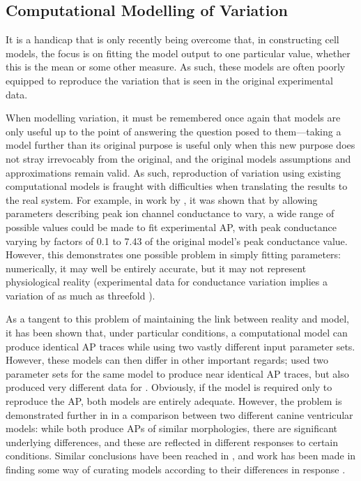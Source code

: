 \documentclass[../thesis-main.tex]{subfiles}
\begin{document}
 \subsection{Computational Modelling of Variation}
 \label{subsec:comp-var}
 It is a handicap that is only recently being overcome that, in constructing cell models, the focus is on fitting the model output to one particular value, whether this is the mean or some other measure. As such, these models are often poorly equipped to reproduce the variation that is seen in the original experimental data.
 
 When modelling variation, it must be remembered once again that models are only useful up to the point of answering the question posed to them---taking a model further than its original purpose is useful only when this new purpose does not stray irrevocably from the original, and the original models assumptions and approximations remain valid. As such, reproduction of variation using existing computational models is fraught with difficulties when translating the results to the real system. For example, in work by \citet{Davies2012}, it was shown that by allowing parameters describing peak ion channel conductance to vary, a wide range of possible values could be made to fit experimental AP, with peak conductance varying by factors of 0.1 to 7.43 of the original model's peak conductance value. However, this demonstrates one possible problem in simply fitting parameters: numerically, it may well be entirely accurate, but it may not represent physiological reality (experimental data for conductance variation implies a variation of as much as threefold \citep{Schulz2006}).
 
 As a tangent to this problem of maintaining the link between reality and model, it has been shown that, under particular conditions, a computational model can produce identical AP traces while using two vastly different input parameter sets. However, these models can then differ in other important regards; \citet{Sarkar2010} used two parameter sets for the same model to produce near identical AP traces, but also produced very different data for \cai{}. Obviously, if the model is required only to reproduce the AP, both models are entirely adequate. However, the problem is demonstrated further in \citet{Cherry2007} in a comparison between two different canine ventricular models: while both produce APs of similar morphologies, there are significant underlying differences, and these are reflected in different responses to certain conditions. Similar conclusions have been reached in \citet{Romero2011}, and work has been made in finding some way of curating models according to their differences in response \citep{Terkildsen2008, Cooper2011}.
 
\end{document}
